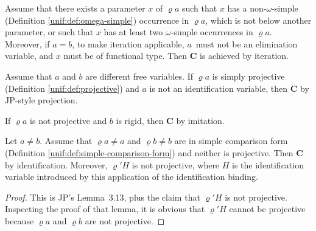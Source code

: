     \begin{lemma}
    [$\jp L{10}$]\label{lem:iteration}
    Assume that
    there exists a parameter $x$ of $\varrho a$ such that
    $x$ has a non-$\omega$-simple (Definition \ref{unif:def:omega-simple}) 
    occurrence in $\varrho a$, which is not below another parameter, or
    such that $x$ has at least two $\omega$-simple occurrences in $\varrho a$.
    Moreover, 
    if $a = b$, to make iteration applicable,
    $a$~must not be an elimination variable, and
    $x$ must be of functional type.
    Then \textbf{C} is achieved by iteration.
    \end{lemma}
    \begin{lemma}
    [$\jp L{11}$]\label{lem:jp-projection}
    Assume that $a$ and $b$ are different free variables.
    If $\varrho a$ is simply
    projective (Definition \ref{unif:def:projective})
    and $a$ is not an identification variable, 
    then \textbf{C} by JP-style projection.
    \end{lemma}
    \begin{lemma}
    [$\jp L{12}$]\label{lem:jp-imitation}If $\varrho a$ is not projective and $b$ is rigid,
    then \textbf{C} by imitation.
    \end{lemma}
    \begin{lemma}
    [$\jp L{13}$]\label{lem:identification}
    Let $a \not= b$.
    Assume that $\varrho a \not= a$ and $\varrho b \not= b$
    are in simple comparison form (Definition \ref{unif:def:simple-comparison-form}) and neither is
    projective. 
    Then \textbf{C} by identification.
    Moreover, $\varrho' H$ is not projective, where $H$ is the identification variable
    introduced by this application of the identification binding.
    \end{lemma}
    \begin{proof}
    This is JP's Lemma~3.13, plus the claim that $\varrho' H$ is not projective.
    Inspecting the proof of that lemma, it is obvious that $\varrho' H$ cannot be projective
    because $\varrho a$ and $\varrho b$ are not projective.
    \end{proof}
